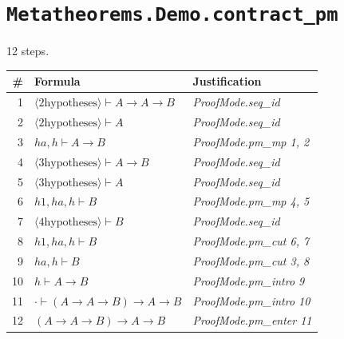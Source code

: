 \section*{\texttt{Metatheorems.Demo.contract\_pm}}
12 steps.

\begin{longtable}{r l l}
\hline
\# & Formula & Justification \\
\hline
\endhead
1 & $\langle 2 \text{hypotheses}\rangle   \vdash  A  \to  A  \to  B$ & \textit{ProofMode.seq\_id} \\
2 & $\langle 2 \text{hypotheses}\rangle   \vdash  A$ & \textit{ProofMode.seq\_id} \\
3 & $ha, h  \vdash  A  \to  B$ & \textit{ProofMode.pm\_mp 1, 2} \\
4 & $\langle 3 \text{hypotheses}\rangle   \vdash  A  \to  B$ & \textit{ProofMode.seq\_id} \\
5 & $\langle 3 \text{hypotheses}\rangle   \vdash  A$ & \textit{ProofMode.seq\_id} \\
6 & $h1, ha, h  \vdash  B$ & \textit{ProofMode.pm\_mp 4, 5} \\
7 & $\langle 4 \text{hypotheses}\rangle   \vdash  B$ & \textit{ProofMode.seq\_id} \\
8 & $h1, ha, h  \vdash  B$ & \textit{ProofMode.pm\_cut 6, 7} \\
9 & $ha, h  \vdash  B$ & \textit{ProofMode.pm\_cut 3, 8} \\
10 & $h  \vdash  A  \to  B$ & \textit{ProofMode.pm\_intro 9} \\
11 & $\cdot  \vdash  (A  \to  A  \to  B)  \to  A  \to  B$ & \textit{ProofMode.pm\_intro 10} \\
12 & $(A  \to  A  \to  B)  \to  A  \to  B$ & \textit{ProofMode.pm\_enter 11} \\
\hline
\end{longtable}

